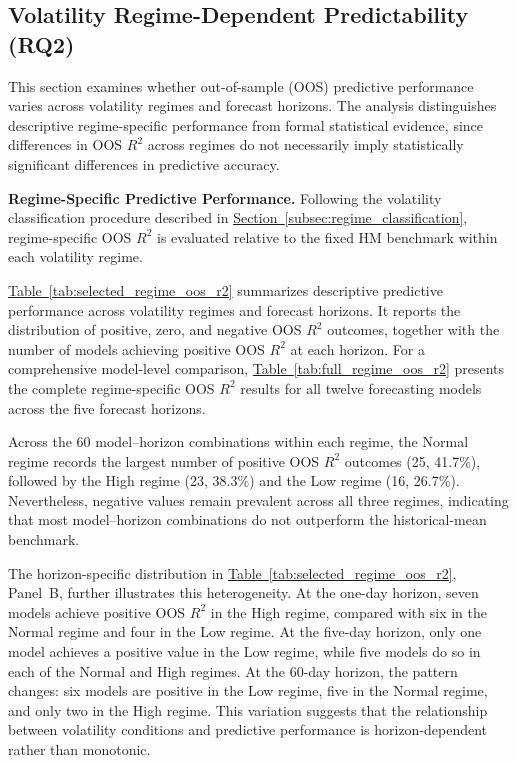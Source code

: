 \documentclass[runningheads,orivec]{llncs}
\makeatletter
\providecommand{\FloatBarrier}{\par\ifx\@deferlist\@empty\else\clearpage\fi}
\makeatother
\begin{document}
\FloatBarrier
\subsection{Volatility Regime-Dependent Predictability (RQ2)}\label{subsec:volatility_regimes}

This section examines whether out-of-sample (OOS) predictive performance varies across volatility regimes and forecast horizons. The analysis distinguishes descriptive regime-specific performance from formal statistical evidence, since differences in OOS $R^2$ across regimes do not necessarily imply statistically significant differences in predictive accuracy.

\medskip
\noindent\textbf{Regime-Specific Predictive Performance.}
Following the volatility classification procedure described in \hyperref[subsec:regime_classification]{Section~\ref*{subsec:regime_classification}}, regime-specific OOS $R^2$ is evaluated relative to the fixed HM benchmark within each volatility regime.

\hyperref[tab:selected_regime_oos_r2]{Table~\ref*{tab:selected_regime_oos_r2}} summarizes descriptive predictive performance across volatility regimes and forecast horizons. It reports the distribution of positive, zero, and negative OOS $R^2$ outcomes, together with the number of models achieving positive OOS $R^2$ at each horizon. For a comprehensive model-level comparison, \hyperref[tab:full_regime_oos_r2]{Table~\ref*{tab:full_regime_oos_r2}} presents the complete regime-specific OOS $R^2$ results for all twelve forecasting models across the five forecast horizons.

Across the 60 model--horizon combinations within each regime, the Normal regime records the largest number of positive OOS $R^2$ outcomes (25, 41.7\%), followed by the High regime (23, 38.3\%) and the Low regime (16, 26.7\%). Nevertheless, negative values remain prevalent across all three regimes, indicating that most model--horizon combinations do not outperform the historical-mean benchmark.

The horizon-specific distribution in \hyperref[tab:selected_regime_oos_r2]{Table~\ref*{tab:selected_regime_oos_r2}}, Panel~B, further illustrates this heterogeneity. At the one-day horizon, seven models achieve positive OOS $R^2$ in the High regime, compared with six in the Normal regime and four in the Low regime. At the five-day horizon, only one model achieves a positive value in the Low regime, while five models do so in each of the Normal and High regimes. At the 60-day horizon, the pattern changes: six models are positive in the Low regime, five in the Normal regime, and only two in the High regime. This variation suggests that the relationship between volatility conditions and predictive performance is horizon-dependent rather than monotonic.
\end{document}
